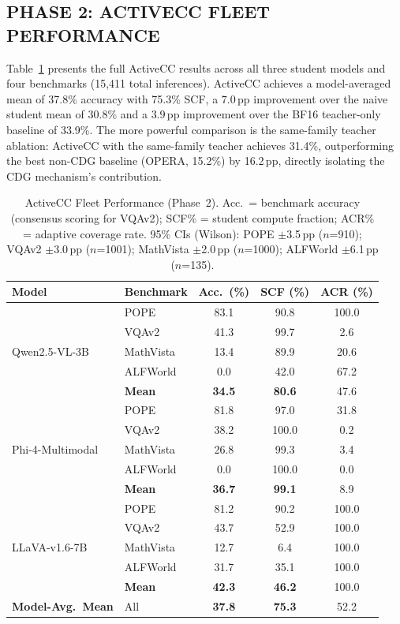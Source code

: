 \documentclass{ieeetmlcn}
\begin{document}
\subsection{PHASE 2: ACTIVECC FLEET PERFORMANCE}
Table~\ref{tab:fleet} presents the full ActiveCC results across all three student models and four benchmarks (15,411 total inferences). ActiveCC achieves a model-averaged mean of 37.8\% accuracy with 75.3\% SCF, a $7.0$\,pp improvement over the naive student mean of 30.8\% and a $3.9$\,pp improvement over the BF16 teacher-only baseline of 33.9\%. The more powerful comparison is the same-family teacher ablation: ActiveCC with the same-family teacher achieves 31.4\%, outperforming the best non-CDG baseline (OPERA, 15.2\%) by 16.2\,pp, directly isolating the CDG mechanism's contribution.

\begin{table}[t]
\caption{ActiveCC Fleet Performance (Phase~2). Acc.\ = benchmark accuracy (consensus scoring for VQAv2); SCF\% = student compute fraction; ACR\% = adaptive coverage rate. 95\% CIs (Wilson): POPE $\pm$3.5\,pp ($n$=910); VQAv2 $\pm$3.0\,pp ($n$=1001); MathVista $\pm$2.0\,pp ($n$=1000); ALFWorld $\pm$6.1\,pp ($n$=135).}
\label{tab:fleet}
\centering
\begin{tabular}{llccc}
\toprule
\textbf{Model} & \textbf{Benchmark} & \textbf{Acc.\ (\%)} &
\textbf{SCF (\%)} & \textbf{ACR (\%)} \\
\midrule
\multirow{5}{*}{Qwen2.5-VL-3B}
  & POPE      & 83.1 & 90.8  & 100.0 \\
  & VQAv2     & 41.3 & 99.7  &   2.6 \\
  & MathVista & 13.4 & 89.9  &  20.6 \\
  & ALFWorld  &  0.0 & 42.0  &  67.2 \\
  & \textbf{Mean} & \textbf{34.5} & \textbf{80.6} & 47.6 \\
\midrule
\multirow{5}{*}{Phi-4-Multimodal}
  & POPE      & 81.8 &  97.0 &  31.8 \\
  & VQAv2     & 38.2 & 100.0 &   0.2 \\
  & MathVista & 26.8 &  99.3 &   3.4 \\
  & ALFWorld  &  0.0 & 100.0 &   0.0 \\
  & \textbf{Mean} & \textbf{36.7} & \textbf{99.1} & 8.9 \\
\midrule
\multirow{5}{*}{LLaVA-v1.6-7B}
  & POPE      & 81.2 & 90.2 & 100.0 \\
  & VQAv2     & 43.7 & 52.9 & 100.0 \\
  & MathVista & 12.7 &  6.4 & 100.0 \\
  & ALFWorld  & 31.7 & 35.1 & 100.0 \\
  & \textbf{Mean} & \textbf{42.3} & \textbf{46.2} & 100.0 \\
\midrule
\textbf{Model-Avg.\ Mean} & All & \textbf{37.8} & \textbf{75.3} & 52.2 \\
\bottomrule
\end{tabular}
\end{table}
\end{document}
